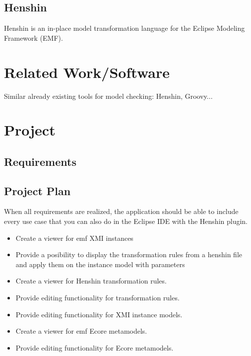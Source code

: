 \documentclass[conference,onecolumn]{IEEEtran}
\begin{document}
  \subsection{Henshin}
  \label{subsec:henshin}
  Henshin is an in-place model transformation language for the Eclipse Modeling Framework (EMF).
  \cite{henshin-repo}

  \section{Related Work/Software}
  \label{sec:related-work}

  Similar already existing tools for model checking: Henshin, Groovy...

  \section{Project}
  \label{sec:project-plan}

  \subsection{Requirements}
  \label{subsec:requirements}



  \subsection{Project Plan}
  \label{subsec:project-plan}
    When all requirements are realized, the application should be able to include every use case that you can also do in the Eclipse IDE with the Henshin plugin.

    \begin{itemize}
    \item Create a viewer for \ac{emf} XMI instances
    \item Provide a posibility to display the transformation rules from a henshin file and apply them on the instance model with parameters
    \item Create a viewer for Henshin transformation rules.
    \item Provide editing functionality for transformation rules.
    \item Provide editing functionality for XMI instance models.
    \item Create a viewer for \ac{emf} Ecore metamodels.
    \item Provide editing functionality for Ecore metamodels.
  \end{itemize}
\end{document}
